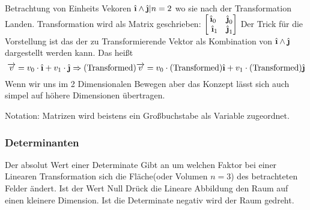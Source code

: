 \documentclass[12pt]{article}
\begin{document}
Betrachtung von Einheits Vekoren \( \ihat \land \jhat \vert n = 2\) wo sie nach der Transformation Landen. Transformation wird als Matrix geschrieben: \( \begin{bmatrix}
\ihat_0 & \jhat_0\\\
\ihat_1 & \jhat_1 
\end{bmatrix} \)  Der Trick für die Vorstellung ist das der zu Transformierende Vektor als Kombination von \( \ihat \land \jhat \) dargestellt werden kann. Das heißt \begin{equation}
\overrightarrow{v} = v_0 \cdot \ihat + v_1 \cdot \jhat \Rightarrow (\text{Transformed}) \overrightarrow{v} = v_0 \cdot (\text{Transformed}) \ihat + v_1 \cdot (\text{Transformed}) \jhat
\end{equation} Wenn wir uns im 2 Dimensionalen Bewegen aber das Konzept lässt sich auch simpel auf höhere Dimensionen übertragen. \newline

Notation: Matrizen wird beistens ein Großbuchstabe als Variable zugeordnet.

\subsubsection*{ Determinanten }

Der absolut Wert einer Determinate Gibt an um welchen Faktor bei einer Linearen Transformation sich die Fläche(oder Volumen \( n = 3\)) des betrachteten Felder ändert. Ist der Wert Null Drück die Lineare Abbildung den Raum auf einen kleinere Dimension. Ist die Determinate negativ wird der Raum gedreht. 
\end{document}
